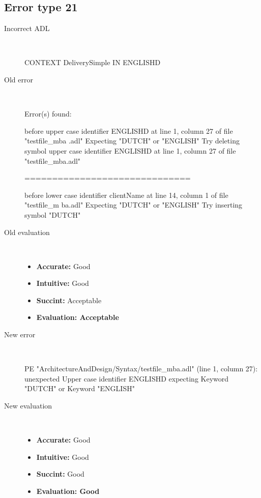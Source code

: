 \hrulefill

\subsection{Error type 21}
  \begin{description}
  \item[Incorrect ADL]~\\
\begin{adl}
CONTEXT DeliverySimple IN ENGLISHD\end{adl}
  \item[Old error]~\\
\begin{haskell}
Error(s) found:

before upper case identifier ENGLISHD at line 1, column 27 of file "testfile_mba
.adl"
Expecting "DUTCH" or "ENGLISH"
Try deleting symbol upper case identifier ENGLISHD at line 1, column 27 of file
"testfile_mba.adl"

==============================

before lower case identifier clientName at line 14, column 1 of file "testfile_m
ba.adl"
Expecting "DUTCH" or "ENGLISH"
Try inserting symbol "DUTCH"\end{haskell}
  \item[Old evaluation]~\\
    \begin{itemize}
    \item \textbf{Accurate:} Good
    \item \textbf{Intuitive:} Good
    \item \textbf{Succint:} Acceptable
    \item \textbf{Evaluation: Acceptable}
    \end{itemize}
  \item[New error]~\\
\begin{haskell}
PE "ArchitectureAndDesign/Syntax/testfile_mba.adl" (line 1, column 27):
unexpected Upper case identifier ENGLISHD
expecting Keyword "DUTCH" or Keyword "ENGLISH"\end{haskell}
  \item[New evaluation]~\\
    \begin{itemize}
    \item \textbf{Accurate:} Good
    \item \textbf{Intuitive:} Good
    \item \textbf{Succint:} Good
    \item \textbf{Evaluation: Good
}
    \end{itemize}
  \end{description}

